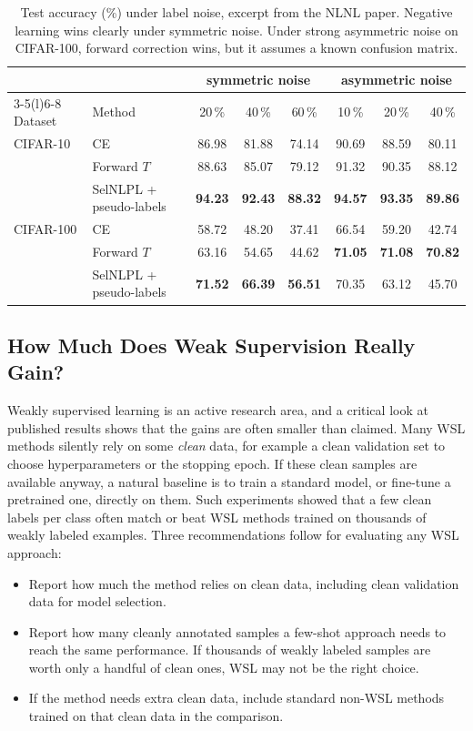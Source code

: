 \begin{table}[ht]
  \centering
  \begin{tabular}{@{}llcccccc@{}}
    \toprule
    & & \multicolumn{3}{c}{symmetric noise} & \multicolumn{3}{c}{asymmetric
      noise} \\
    \cmidrule(lr){3-5}\cmidrule(l){6-8}
    Dataset & Method & 20\,\% & 40\,\% & 60\,\% & 10\,\% & 20\,\% & 40\,\% \\
    \midrule
    CIFAR-10 & CE & 86.98 & 81.88 & 74.14 & 90.69 & 88.59 & 80.11 \\
      & Forward $T$ & 88.63 & 85.07 & 79.12 & 91.32 & 90.35 & 88.12 \\
      & SelNLPL + pseudo-labels & \textbf{94.23} & \textbf{92.43} &
        \textbf{88.32} & \textbf{94.57} & \textbf{93.35} & \textbf{89.86} \\
    \midrule
    CIFAR-100 & CE & 58.72 & 48.20 & 37.41 & 66.54 & 59.20 & 42.74 \\
      & Forward $T$ & 63.16 & 54.65 & 44.62 & \textbf{71.05} & \textbf{71.08}
        & \textbf{70.82} \\
      & SelNLPL + pseudo-labels & \textbf{71.52} & \textbf{66.39} &
        \textbf{56.51} & 70.35 & 63.12 & 45.70 \\
    \bottomrule
  \end{tabular}
  \caption{Test accuracy (\%) under label noise, excerpt from the NLNL paper.
  Negative learning wins clearly under symmetric noise. Under strong
  asymmetric noise on CIFAR-100, forward correction wins, but it assumes a
  known confusion matrix.}
  \label{tab:nl-results}
\end{table}

\subsection{How Much Does Weak Supervision Really Gain?}

Weakly supervised learning is an active research area, and a critical look
at published results shows that the gains are often smaller than claimed.
Many WSL methods silently rely on some \emph{clean} data, for example a
clean validation set to choose hyperparameters or the stopping epoch. If
these clean samples are available anyway, a natural baseline is to train a
standard model, or fine-tune a pretrained one, directly on them. Such
experiments showed that a few clean labels per class often match or beat
WSL methods trained on thousands of weakly labeled examples. Three
recommendations follow for evaluating any WSL approach:
\begin{itemize}
  \item Report how much the method relies on clean data, including clean
    validation data for model selection.
  \item Report how many cleanly annotated samples a few-shot approach needs
    to reach the same performance. If thousands of weakly labeled samples
    are worth only a handful of clean ones, WSL may not be the right
    choice.
  \item If the method needs extra clean data, include standard non-WSL
    methods trained on that clean data in the comparison.
\end{itemize}

